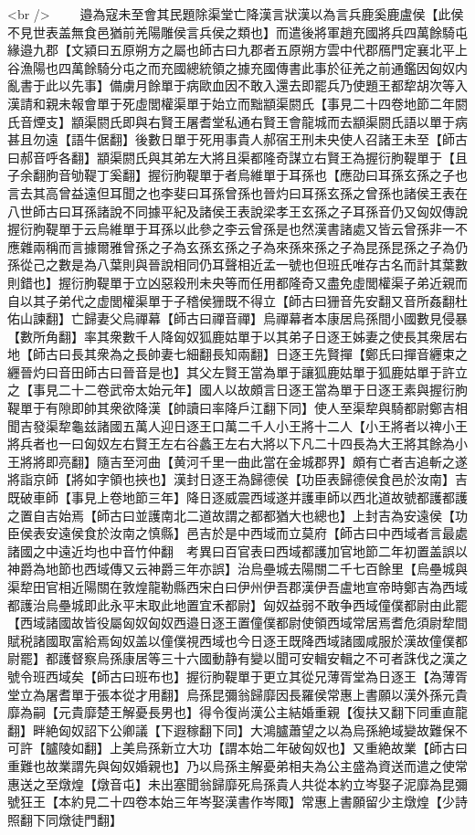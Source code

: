 <br />
　　邉為寇未至會其民題除渠堂亡降漢言狀漢以為言兵鹿奚鹿盧侯【此侯不見世表盖無食邑猶前羌陽雕侯言兵侯之類也】而遣後將軍趙充國將兵四萬餘騎屯緣邉九郡【文潁曰五原朔方之屬也師古曰九郡者五原朔方雲中代郡鴈門定襄北平上谷漁陽也四萬餘騎分屯之而充國總統領之據充國傳書此事於征羌之前通鑑因匈奴内亂書于此以先事】備虜月餘單于病歐血因不敢入還去即罷兵乃使題王都犂胡次等入漢請和親未報會單于死虛閭權渠單于始立而黜顓渠閼氏【事見二十四卷地節二年閼氏音煙支】顓渠閼氏即與右賢王屠耆堂私通右賢王會龍城而去顓渠閼氏語以單于病甚且勿遠【語牛倨翻】後數日單于死用事貴人郝宿王刑未央使人召諸王未至【師古曰郝音呼各翻】顓渠閼氏與其弟左大將且渠都隆奇謀立右賢王為握衍朐鞮單于【且子余翻朐音劬鞮丁奚翻】握衍朐鞮單于者烏維單于耳孫也【應劭曰耳孫玄孫之子也言去其高曾益遠但耳聞之也李斐曰耳孫曾孫也晉灼曰耳孫玄孫之曾孫也諸侯王表在八世師古曰耳孫諸說不同據平紀及諸侯王表說梁孝王玄孫之子耳孫音仍又匈奴傳說握衍朐鞮單于云烏維單于耳孫以此參之李云曾孫是也然漢書諸處又皆云曾孫非一不應雜兩稱而言據爾雅曾孫之子為玄孫玄孫之子為來孫來孫之子為昆孫昆孫之子為仍孫從己之數是為八葉則與晉說相同仍耳聲相近孟一號也但班氏唯存古名而計其葉數則錯也】握衍朐鞮單于立凶惡殺刑未央等而任用都隆奇又盡免虛閭權渠子弟近親而自以其子弟代之虚閭權渠單于子稽侯㹪既不得立【師古曰㹪音先安翻又音所姦翻杜佑山諫翻】亡歸妻父烏禪幕【師古曰禪音禪】烏禪幕者本康居烏孫間小國數見侵暴【數所角翻】率其衆數千人降匈奴狐鹿姑單于以其弟子日逐王姊妻之使長其衆居右地【師古曰長其衆為之長帥妻七細翻長知兩翻】日逐王先賢撣【鄭氏曰撣音纒束之纒晉灼曰音田師古曰晉音是也】其父左賢王當為單于讓狐鹿姑單于狐鹿姑單于許立之【事見二十二卷武帝太始元年】國人以故頗言日逐王當為單于日逐王素與握衍朐鞮單于有隙即帥其衆欲降漢【帥讀曰率降戶江翻下同】使人至渠犂與騎都尉鄭吉相聞吉發渠犂龜兹諸國五萬人迎日逐王口萬二千人小王將十二人【小王將者以禆小王將兵者也一曰匈奴左右賢王左右谷蠡王左右大將以下凡二十四長為大王將其餘為小王將將即亮翻】隨吉至河曲【黄河千里一曲此當在金城郡界】頗有亡者吉追斬之遂將詣京師【將如字領也挾也】漢封日逐王為歸德侯【功臣表歸德侯食邑於汝南】吉既破車師【事見上卷地節三年】降日逐威震西域遂并護車師以西北道故號都護都護之置自吉始焉【師古曰並護南北二道故謂之都都猶大也總也】上封吉為安遠侯【功臣侯表安遠侯食於汝南之慎縣】邑吉於是中西域而立莫府【師古曰中西域者言最處諸國之中遠近均也中音竹仲翻　考異曰百官表曰西域都護加官地節二年初置盖誤以神爵為地節也西域傳又云神爵三年亦誤】治烏壘城去陽關二千七百餘里【烏壘城與渠犂田官相近陽關在敦煌龍勒縣西宋白曰伊州伊吾郡漢伊吾盧地宣帝時鄭吉為西域都護治烏壘城即此永平末取此地置宜禾都尉】匈奴益弱不敢争西域僮僕都尉由此罷【西域諸國故皆役屬匈奴匈奴西邉日逐王置僮僕都尉使領西域常居焉耆危須尉犂間賦税諸國取富給焉匈奴盖以僮僕視西域也今日逐王既降西域諸國咸服於漢故僮僕都尉罷】都護督察烏孫康居等三十六國動静有變以聞可安輯安輯之不可者誅伐之漢之號令班西域矣【師古曰班布也】握衍朐鞮單于更立其從兄薄胥堂為日逐王【為薄胥堂立為屠耆單于張本從才用翻】烏孫昆彌翁歸靡因長羅侯常惠上書願以漢外孫元貴靡為嗣【元貴靡楚王解憂長男也】得令復尚漢公主結婚重親【復扶又翻下同重直龍翻】畔絶匈奴詔下公卿議【下遐稼翻下同】大鴻臚蕭望之以為烏孫絶域變故難保不可許【臚陵如翻】上美烏孫新立大功【謂本始二年破匈奴也】又重絶故業【師古曰重難也故業謂先與匈奴婚親也】乃以烏孫主解憂弟相夫為公主盛為資送而遣之使常惠送之至燉煌【燉音屯】未出塞聞翁歸靡死烏孫貴人共從本約立岑娶子泥靡為昆彌號狂王【本約見二十四卷本始三年岑娶漢書作岑陬】常惠上書願留少主燉煌【少詩照翻下同燉徒門翻】